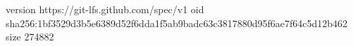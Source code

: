 version https://git-lfs.github.com/spec/v1
oid sha256:1bf3529d3b5e6389d52f6dda1f5ab9badc63c3817880d95f6ae7f64c5d12b462
size 274882
